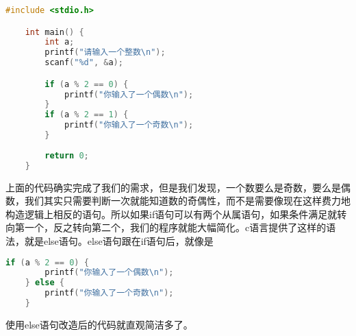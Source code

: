 \begin{lstlisting}[language=C]
    #include <stdio.h>

    int main() {
        int a;
        printf("请输入一个整数\n");
        scanf("%d", &a);

        if (a % 2 == 0) {
            printf("你输入了一个偶数\n");
        }
        if (a % 2 == 1) {
            printf("你输入了一个奇数\n");
        }
        
        return 0;
    }
\end{lstlisting}

上面的代码确实完成了我们的需求，但是我们发现，一个数要么是奇数，要么是偶数，我们其实只需要判断一次就能知道数的奇偶性，而不是需要像现在这样费力地构造逻辑上相反的语句。所以如果if语句可以有两个从属语句，如果条件满足就转向第一个，反之转向第二个，我们的程序就能大幅简化。c语言提供了这样的语法，就是else语句。else语句跟在if语句后，就像是

\begin{lstlisting}[language=C]
    if (a % 2 == 0) {
        printf("你输入了一个偶数\n");
    } else {
        printf("你输入了一个奇数\n");
    }
\end{lstlisting}

使用else语句改造后的代码就直观简洁多了。
